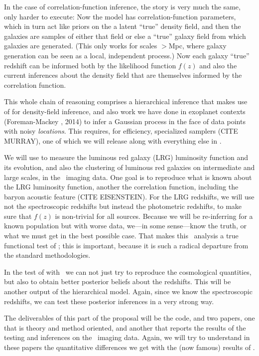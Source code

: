 \documentclass[12pt]{article}
\begin{document}
In the case of correlation-function inference, the story is very much
the same, only harder to execute:
Now the model has correlation-function parameters, which in turn act
like priors on the a latent ``true'' density field, and then the
galaxies are samples of either that field or else a ``true'' galaxy
field from which galaxies are generated.
(This only works for scales $>$Mpc, where galaxy generation can be
seen as a local, independent process.)
Now each galaxy ``true'' redshift can be informed both by the likelihood
function $f(z)$ and also the current inferences about the density field
that are themselves informed by the correlation function.

This whole chain of reasoning comprises a hierarchical inference that
makes use of  for density-field inference, and
also work we have done in exoplanet contexts (Foreman-Mackey \etal, 2014) to infer a
Gaussian process in the face of data points with noisy \emph{locations}.
This requires, for efficiency, specialized samplers (CITE MURRAY), one
of which we will release along with everything else in
.

We will use  to measure the luminous red galaxy
(LRG) luminosity function and its evolution, and also the clustering
of luminous red galaxies on intermediate and large scales, in the
\sdss\ imaging data.
One goal is to reproduce what is known about the LRG luminosity
function, another the correlation function, including the baryon
acoustic feature (CITE EISENSTEIN).
For the LRG redshifts, we will use not the spectroscopic redshifts but
instead the photometric redshifts, to make sure that $f(z)$ is
non-trivial for all sources.
Because we will be re-inferring for a known population but with worse
data, we---in some sense---know the truth, or what we must get in the
best possible case.
That makes this \sdss\ analysis a true functional test of
; this is important, because it is such a radical
departure from the standard methodologies.

In the test of  with \sdss\ we can not just try to
reproduce the cosmological quantities, but also to obtain better
posterior beliefs about the redshifts.
This will be another output of the hierarchical model.
Again, since we know the spectroscopic redshifts, we can test these
posterior inferences in a very strong way.

The deliverables of this part of the proposal will be the
 code, and two papers, one that is theory and
method oriented, and another that reports the results of the testing
and inferences on the \sdss\ imaging data.
Again, we will try to understand in these papers the quantitative
differences we get with the (now famous) results of \sdss.
\end{document}
